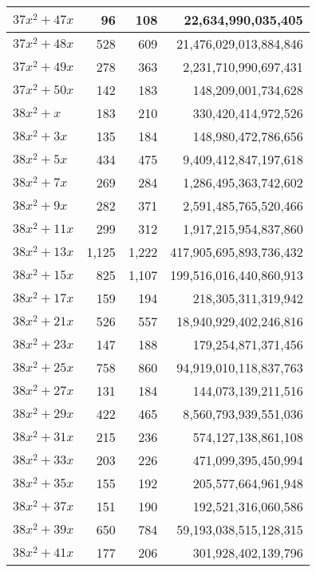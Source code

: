 \documentclass[a4paper]{amsproc}
\theoremstyle{plain}
\begin{document}
\begin{longtable}{ | l | r | r | r | }
$37x^2 + 47x$ & 96 & 108 & 22{,}634{,}990{,}035{,}405 \\ \hline
$37x^2 + 48x$ & 528 & 609 & 21{,}476{,}029{,}013{,}884{,}846 \\ \hline
$37x^2 + 49x$ & 278 & 363 & 2{,}231{,}710{,}990{,}697{,}431 \\ \hline
$37x^2 + 50x$ & 142 & 183 & 148{,}209{,}001{,}734{,}628 \\ \hline
$38x^2 + x$ & 183 & 210 & 330{,}420{,}414{,}972{,}526 \\ \hline
$38x^2 + 3x$ & 135 & 184 & 148{,}980{,}472{,}786{,}656 \\ \hline
$38x^2 + 5x$ & 434 & 475 & 9{,}409{,}412{,}847{,}197{,}618 \\ \hline
$38x^2 + 7x$ & 269 & 284 & 1{,}286{,}495{,}363{,}742{,}602 \\ \hline
$38x^2 + 9x$ & 282 & 371 & 2{,}591{,}485{,}765{,}520{,}466 \\ \hline
$38x^2 + 11x$ & 299 & 312 & 1{,}917{,}215{,}954{,}837{,}860 \\ \hline
$38x^2 + 13x$ & 1{,}125 & 1{,}222 & 417{,}905{,}695{,}893{,}736{,}432 \\ \hline
$38x^2 + 15x$ & 825 & 1{,}107 & 199{,}516{,}016{,}440{,}860{,}913 \\ \hline
$38x^2 + 17x$ & 159 & 194 & 218{,}305{,}311{,}319{,}942 \\ \hline
$38x^2 + 21x$ & 526 & 557 & 18{,}940{,}929{,}402{,}246{,}816 \\ \hline
$38x^2 + 23x$ & 147 & 188 & 179{,}254{,}871{,}371{,}456 \\ \hline
$38x^2 + 25x$ & 758 & 860 & 94{,}919{,}010{,}118{,}837{,}763 \\ \hline
$38x^2 + 27x$ & 131 & 184 & 144{,}073{,}139{,}211{,}516 \\ \hline
$38x^2 + 29x$ & 422 & 465 & 8{,}560{,}793{,}939{,}551{,}036 \\ \hline
$38x^2 + 31x$ & 215 & 236 & 574{,}127{,}138{,}861{,}108 \\ \hline
$38x^2 + 33x$ & 203 & 226 & 471{,}099{,}395{,}450{,}994 \\ \hline
$38x^2 + 35x$ & 155 & 192 & 205{,}577{,}664{,}961{,}948 \\ \hline
$38x^2 + 37x$ & 151 & 190 & 192{,}521{,}316{,}060{,}586 \\ \hline
$38x^2 + 39x$ & 650 & 784 & 59{,}193{,}038{,}515{,}128{,}315 \\ \hline
$38x^2 + 41x$ & 177 & 206 & 301{,}928{,}402{,}139{,}796 \\ \hline

\end{longtable}
\end{document}
